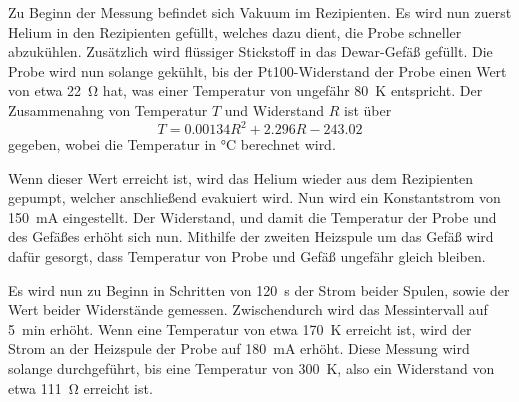     Zu Beginn der Messung befindet sich Vakuum im Rezipienten.
    Es wird nun zuerst Helium in den Rezipienten gefüllt,
    welches dazu dient,
    die Probe schneller abzukühlen.
    Zusätzlich wird flüssiger Stickstoff in das Dewar-Gefäß gefüllt.
    Die Probe wird nun solange gekühlt,
    bis der Pt100-Widerstand der Probe einen Wert von etwa \SI{22}{\ohm} hat,
    was einer Temperatur von ungefähr \SI{80}{\kelvin} entspricht.
    Der Zusammenahng von Temperatur $T$ und Widerstand $R$ ist über
    \begin{equation}
        T = 0.00134 R^2 + 2.296 R - 243.02
    \end{equation}
    gegeben,
    wobei die Temperatur in \si{\celsius} berechnet wird.

    Wenn dieser Wert erreicht ist,
    wird das Helium wieder aus dem Rezipienten gepumpt,
    welcher anschließend evakuiert wird.
    Nun wird ein Konstantstrom von \SI{150}{\milli\ampere} eingestellt.
    Der Widerstand,
    und damit die Temperatur der Probe und des Gefäßes erhöht sich nun.
    Mithilfe der zweiten Heizspule um das Gefäß wird dafür gesorgt,
    dass Temperatur von Probe und Gefäß ungefähr gleich bleiben.

    Es wird nun zu Beginn in Schritten von \SI{120}{\second} der Strom beider Spulen,
    sowie der Wert beider Widerstände gemessen.
    Zwischendurch wird das Messintervall auf \SI{5}{\minute} erhöht.
    Wenn eine Temperatur von etwa \SI{170}{\kelvin} erreicht ist,
    wird der Strom an der Heizspule der Probe auf \SI{180}{\milli\ampere} erhöht.
    Diese Messung wird solange durchgeführt,
    bis eine Temperatur von \SI{300}{\kelvin},
    also ein Widerstand von etwa \SI{111}{\ohm} erreicht ist.

